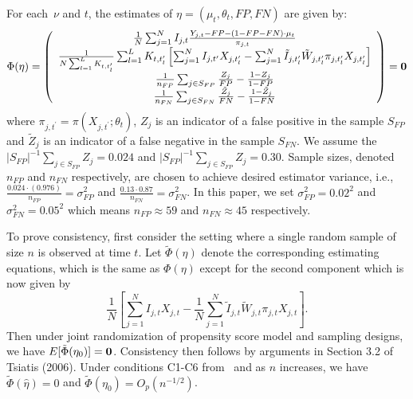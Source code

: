 \documentclass[11pt]{amsart}
\numberwithin{equation}{section}
\theoremstyle{plain}
\begin{document}
For each~$\nu$ and $t$, the estimates of $\eta = (\mu_t, \theta_t, FP, FN)$ are given by:
$$
\Phi (\eta) = \left (
\begin{array}{c}
\frac{1}{N} \sum_{j=1}^N I_{j,t} \frac{Y_{j,t} - FP - (1-FP-FN) \cdot \mu_t}{\pi_{j,t}} \\
\frac{1}{N \sum_{l=1}^L K_{t,t_l^\prime}} \sum_{l=1}^L K_{t,t_l^\prime} \left[ \sum_{j=1}^N I_{j,t^\prime} X_{j,t^\prime_l} - \sum_{j = 1}^N \tilde I_{j,t_l^\prime} \tilde W_{j,t_l^\prime}  \pi_{j,t_l^\prime} X_{j,t_l^\prime} \right] \\
\frac{1}{n_{FP}} \sum_{j \in S_{FP}} \frac{Z_j}{FP} - \frac{1-Z_j}{1-FP} \\
\frac{1}{n_{FN}} \sum_{j \in S_{FN}} \frac{\tilde Z_j}{FN} - \frac{1-\tilde Z_j}{1-FN} \\
\end{array}
\right ) = {\bf 0}
$$
where $\pi_{j,t^\prime} = \pi (X_{j,t^\prime}; \theta_t)$, $Z_j$ is an indicator of a false positive in the sample $S_{FP}$  and $\tilde Z_j$ is an indicator of a false negative in the sample $S_{FN}$.  We assume the $|S_{FP}|^{-1} \sum_{j \in S_{FP}} Z_j = 0.024$ and $|S_{FP}|^{-1} \sum_{j \in S_{FP}} Z_j = 0.30$.  Sample sizes, denoted $n_{FP}$ and $n_{FN}$ respectively, are chosen to achieve desired estimator variance, i.e., $\frac{0.024 \cdot (0.976)}{n_{FP}} = \sigma^2_{FP}$ and $\frac{0.13 \cdot 0.87}{n_{FN}} = \sigma^2_{FN}$. In this paper, we set $\sigma^2_{FP} = 0.02^2$ and $\sigma_{FN}^2 = 0.05^2$ which means $n_{FP} \approx 59$ and $n_{FN} \approx 45$ respectively.

To prove consistency, first consider the setting where a single random sample of size $n$ is observed at time $t$.  Let $\tilde \Phi (\eta)$ denote the corresponding estimating equations, which is the same as $\Phi(\eta)$ except for the second component which is now given by
$$
\frac{1}{N} \left[ \sum_{j=1}^N I_{j,t} X_{j,t} - \frac{1}{N} \sum_{j = 1}^N \tilde I_{j,t} \tilde W_{j,t}  \pi_{j,t} X_{j,t} \right].
$$
Then under joint randomization of propensity score model and sampling designs, we have $E [ \tilde \Phi (\eta_0) ] = {\bf 0}$.  Consistency then follows by arguments in Section 3.2 of Tsiatis (2006). Under conditions C1-C6 from~\cite{Chen2019} and as $n$ increases, we have $\tilde \Phi (\hat \eta) = 0$ and $\tilde \Phi(\eta_0) = O_p ( n^{-1/2} )$.
\end{document}
